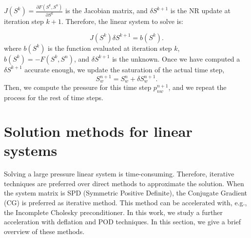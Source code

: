 \documentclass[12pt]{article}
\begin{document}
${J}({S}^k)=\frac{\partial {F}({S}^k,{S}^n)}{\partial {S}^k}$ is the 
Jacobian matrix, and $\delta {S}^{k+1}$ is the NR update at iteration step $k+1$. Therefore, the linear system to solve is:\par
\begin{equation}\label{eq:lsS}
{J}({S}^k)\delta {S}^{k+1}={b}({S}^k).
\end{equation}
where ${b}({S}^k)$ is the function evaluated at iteration step $k$, ${b}({S}^k)=-{F}({S}^k,{S}^n)$, and $\delta {S}^{k+1}$ is 
the unknown. Once we have computed a $\delta {S}^{k+1}$ accurate enough, we update the saturation of the actual time step, 
\begin{equation*}
 {S}_w^{n+1}={S}_w^n+\delta {S}_w^{n+1}.
\end{equation*}
Then, we compute the pressure for this time step $p^{n+1}_{nw}$, and we repeat the process for the rest of time steps.  

\newpage
\section{Solution methods for linear systems}\label{itsol}
\hspace{0.5cm}Solving a large pressure linear system is time-consuming. Therefore, iterative techniques are preferred over 
direct methods to approximate the solution.  
When the system matrix is SPD (Symmetric Positive Definite), the Conjugate Gradient (CG) is preferred as iterative method. 
This method can be accelerated with, e.g., the Incomplete Cholesky preconditioner. In this work, we study a further 
acceleration with deflation and POD techniques. In this section, we give a brief overview of these methods. 
\end{document}
